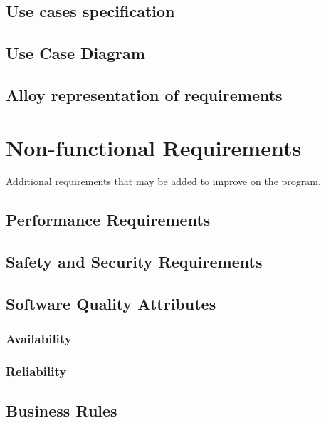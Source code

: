 \documentclass[12pt]{article}
\begin{document}
\subsection{Use cases specification}
\subsection{Use Case Diagram}
\subsection{Alloy representation of requirements}

\clearpage\section{Non-functional Requirements}
Additional requirements that may be added to improve on the program.
\subsection{Performance Requirements}
\subsection{Safety and Security Requirements}
\subsection{Software Quality Attributes}
\subsubsection{Availability}
\subsubsection{Reliability}
\subsection{Business Rules}
\end{document}

